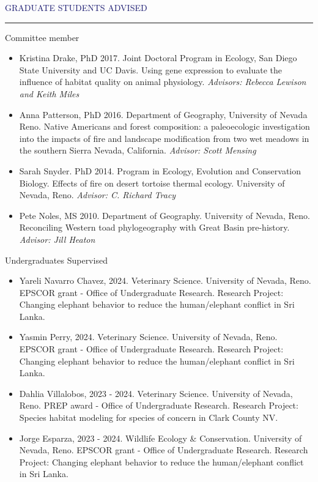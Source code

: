 \documentclass{resume} %
\renewenvironment{rSection}[1]{
\sectionskip
\textcolor{MidnightBlue}{\MakeUppercase{#1}}
\sectionlineskip
\hrule
\begin{list}{}{
\setlength{\leftmargin}{1.5em}
}
\item[]
}{
\end{list}
}
\begin{document}
\begin{rSection}{Graduate Students Advised}
\begin{rSubsection}{Committee member}{}{}{}
\begin{itemize}
   \item[]Kristina Drake, PhD 2017. Joint Doctoral Program in Ecology, San Diego State University and UC Davis. Using gene expression to evaluate the influence of habitat quality on animal physiology. \textit{Advisors: Rebecca Lewison and Keith Miles}
  \item[] Anna Patterson, PhD 2016. Department of Geography, University of Nevada Reno. Native Americans and forest composition: a paleoecologic investigation into the impacts of fire and landscape modification from two wet meadows in the southern Sierra Nevada, California. \textit{ Advisor: Scott Mensing}
   \item[]Sarah Snyder. PhD 2014. Program in Ecology, Evolution and Conservation Biology. Effects of fire on desert tortoise thermal ecology. University of Nevada, Reno. \textit{ Advisor: C. Richard Tracy}
   \item[]Pete Noles, MS 2010. Department of Geography. University of Nevada, Reno. Reconciling Western toad phylogeography with Great Basin pre-history. \textit{Advisor: Jill Heaton}\\
   
\end{itemize}
\end{rSubsection}
\begin{rSubsection}{Undergraduates Supervised}{}{}{}
\begin{itemize}

\item[] Yareli Navarro Chavez, 2024. Veterinary Science. University of Nevada, Reno. EPSCOR grant - Office of Undergraduate Research. Research Project: Changing elephant behavior to reduce the human/elephant conflict in Sri Lanka.

\item[] Yasmin Perry, 2024. Veterinary Science. University of Nevada, Reno. EPSCOR grant - Office of Undergraduate Research. Research Project: Changing elephant behavior to reduce the human/elephant conflict in Sri Lanka.

  \item[] Dahlia Villalobos, 2023 - 2024. Veterinary Science. University of Nevada, Reno. PREP award - Office of Undergraduate Research. Research Project: Species habitat modeling for species of concern in Clark County NV.
  
  \item[] Jorge Esparza, 2023 - 2024. Wildlife Ecology & Conservation. University of Nevada, Reno. EPSCOR grant - Office of Undergraduate Research. Research Project: Changing elephant behavior to reduce the human/elephant conflict in Sri Lanka.
  

\end{itemize}
\end{rSubsection}
\end{rSection}
\end{document}

